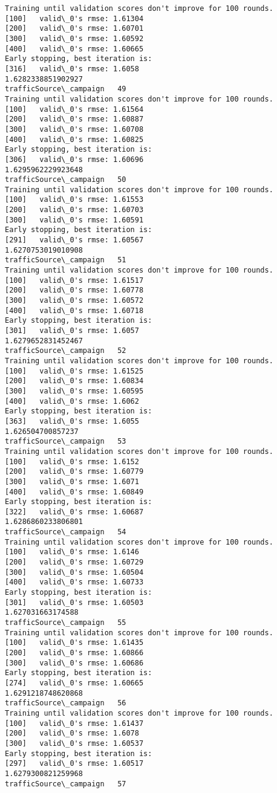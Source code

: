 \documentclass[11pt]{article}
\begin{document}
\begin{Verbatim}[commandchars=\\\{\}]
Training until validation scores don't improve for 100 rounds.
[100]	valid\_0's rmse: 1.61304
[200]	valid\_0's rmse: 1.60701
[300]	valid\_0's rmse: 1.60592
[400]	valid\_0's rmse: 1.60665
Early stopping, best iteration is:
[316]	valid\_0's rmse: 1.6058
1.6282338851902927
trafficSource\_campaign   49
Training until validation scores don't improve for 100 rounds.
[100]	valid\_0's rmse: 1.61564
[200]	valid\_0's rmse: 1.60887
[300]	valid\_0's rmse: 1.60708
[400]	valid\_0's rmse: 1.60825
Early stopping, best iteration is:
[306]	valid\_0's rmse: 1.60696
1.6295962229923648
trafficSource\_campaign   50
Training until validation scores don't improve for 100 rounds.
[100]	valid\_0's rmse: 1.61553
[200]	valid\_0's rmse: 1.60703
[300]	valid\_0's rmse: 1.60591
Early stopping, best iteration is:
[291]	valid\_0's rmse: 1.60567
1.6270753019010908
trafficSource\_campaign   51
Training until validation scores don't improve for 100 rounds.
[100]	valid\_0's rmse: 1.61517
[200]	valid\_0's rmse: 1.60778
[300]	valid\_0's rmse: 1.60572
[400]	valid\_0's rmse: 1.60718
Early stopping, best iteration is:
[301]	valid\_0's rmse: 1.6057
1.6279652831452467
trafficSource\_campaign   52
Training until validation scores don't improve for 100 rounds.
[100]	valid\_0's rmse: 1.61525
[200]	valid\_0's rmse: 1.60834
[300]	valid\_0's rmse: 1.60595
[400]	valid\_0's rmse: 1.6062
Early stopping, best iteration is:
[363]	valid\_0's rmse: 1.6055
1.626504700857237
trafficSource\_campaign   53
Training until validation scores don't improve for 100 rounds.
[100]	valid\_0's rmse: 1.6152
[200]	valid\_0's rmse: 1.60779
[300]	valid\_0's rmse: 1.6071
[400]	valid\_0's rmse: 1.60849
Early stopping, best iteration is:
[322]	valid\_0's rmse: 1.60687
1.6286860233806801
trafficSource\_campaign   54
Training until validation scores don't improve for 100 rounds.
[100]	valid\_0's rmse: 1.6146
[200]	valid\_0's rmse: 1.60729
[300]	valid\_0's rmse: 1.60504
[400]	valid\_0's rmse: 1.60733
Early stopping, best iteration is:
[301]	valid\_0's rmse: 1.60503
1.627031663174588
trafficSource\_campaign   55
Training until validation scores don't improve for 100 rounds.
[100]	valid\_0's rmse: 1.61435
[200]	valid\_0's rmse: 1.60866
[300]	valid\_0's rmse: 1.60686
Early stopping, best iteration is:
[274]	valid\_0's rmse: 1.60665
1.6291218748620868
trafficSource\_campaign   56
Training until validation scores don't improve for 100 rounds.
[100]	valid\_0's rmse: 1.61437
[200]	valid\_0's rmse: 1.6078
[300]	valid\_0's rmse: 1.60537
Early stopping, best iteration is:
[297]	valid\_0's rmse: 1.60517
1.6279300821259968
trafficSource\_campaign   57

\end{Verbatim}
\end{document}
